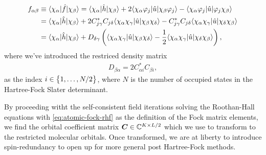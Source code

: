             \begin{align}
                f_{\alpha\beta}
                &\equiv \langle \chi_{\alpha} |\hat{f}| \chi_{\beta} \rangle
                =
                \langle \chi_{\alpha} |\hat{h}| \chi_{\beta} \rangle
                +
                2 \langle \chi_{\alpha}\varphi_j |
                \hat{u}
                | \chi_{\beta}\varphi_j \rangle
                - \langle \chi_{\alpha}\varphi_j |
                \hat{u}
                | \varphi_j\chi_{\beta} \rangle
                \\
                &=
                \langle \chi_{\alpha} |\hat{h}| \chi_{\beta} \rangle
                + 2 C^{*}_{j\gamma} C_{j\delta}
                \langle \chi_{\alpha}\chi_{\gamma} |
                \hat{u}
                | \chi_{\beta}\chi_{\delta} \rangle
                - C^{*}_{j\gamma} C_{j\delta}
                \langle \chi_{\alpha}\chi_{\gamma} |
                \hat{u}
                | \chi_{\delta}\chi_{\beta} \rangle
                \\
                &=
                \langle \chi_{\alpha} |\hat{h}| \chi_{\beta} \rangle
                + D_{\delta\gamma}
                \left( 
                    \langle \chi_{\alpha}\chi_{\gamma} |
                    \hat{u}
                    | \chi_{\beta}\chi_{\delta} \rangle
                    -
                    \frac{1}{2}
                    \langle \chi_{\alpha}\chi_{\gamma} |
                    \hat{u}
                    | \chi_{\delta}\chi_{\beta} \rangle
                 \right),
                \label{eq:atomic-fock-rhf}
            \end{align}
            where we've introduced the restriced density matrix
            \begin{align}
                D_{\beta \alpha}
                = 2 C^{*}_{\alpha i} C_{\beta i},
            \end{align}
            as the index $i \in \left\{ 1, \dots, N / 2 \right\}$, where $N$ is the number
            of occupied states in the Hartree-Fock Slater determinant.

            By proceeding witht the self-consistent field iterations solving the
            Roothan-Hall equations with \autoref{eq:atomic-fock-rhf} as the
            definition of the Fock matrix elements, we find the orbital
            coefficient matrix $\boldsymbol{C} \in \mathbb{C}^{K \times L/2}$ which we
            use to transform to the restricted molecular orbitals.
            Once transformed, we are at liberty to introduce spin-redundancy to
            open up for more general post Hartree-Fock methods.

